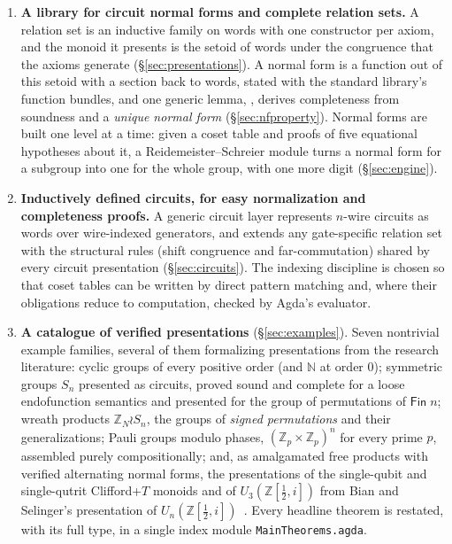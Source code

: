 \begin{enumerate}
\item[(0)] \textbf{A library for circuit normal forms and complete relation
  sets.}  A relation set is an inductive family on words with one
  constructor per axiom, and the monoid it presents is the setoid of words
  under the congruence that the axioms generate
  (\S\ref{sec:presentations}).  A normal form is a function out of this
  setoid with a section back to words, stated with the standard library's
  function bundles, and one generic lemma, , derives
  completeness from soundness and a \emph{unique normal form}
  (\S\ref{sec:nfproperty}).  Normal forms are built one level at a time:
  given a coset table and proofs of five equational hypotheses about it, a
  Reidemeister--Schreier module turns a normal form for a subgroup into one
  for the whole group, with one more digit (\S\ref{sec:engine}).

\item[(1)] \textbf{Inductively defined circuits, for easy normalization and
  completeness proofs.}  A generic circuit layer represents $n$-wire circuits
  as words over wire-indexed generators, and extends any gate-specific
  relation set with the structural rules (shift congruence and
  far-commutation) shared by every circuit presentation
  (\S\ref{sec:circuits}).  The indexing discipline is chosen so that
  coset tables can be written by direct pattern matching and, where their
  obligations reduce to computation, checked by Agda's evaluator.

\item[(2)] \textbf{A catalogue of verified presentations}
  (\S\ref{sec:examples}).  Seven nontrivial example families, several of them
  formalizing presentations from the research literature: cyclic groups
  of every positive order (and $\mathbb{N}$ at order $0$);
  symmetric groups $S_n$ presented as circuits, proved sound and
  complete for a loose endofunction semantics and presented
  for the group of permutations of $\mathsf{Fin}\;n$; wreath products
  $\mathbb{Z}_N \wr S_n$, the groups of \emph{signed permutations} and
  their generalizations;
  Pauli groups modulo phases, $(\mathbb{Z}_p \times \mathbb{Z}_p)^n$
  for every prime $p$, assembled purely compositionally; and, as
  amalgamated free products with verified alternating
  normal forms, the presentations of the single-qubit and single-qutrit
  Clifford+$T$ monoids and of $U_3(\mathbb{Z}[\tfrac12,i])$ from Bian
  and Selinger's presentation of $U_n(\mathbb{Z}[\tfrac12,i])$~\cite{bian2021un}.
  Every headline theorem is
  restated, with its full type, in a single index module
  \texttt{MainTheorems.agda}.


\end{enumerate}
